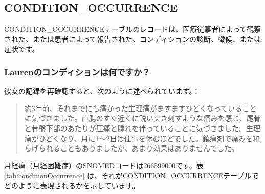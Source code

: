 \documentclass[
  11pt]{book}
\theoremstyle{definition}
\theoremstyle{definition}
\theoremstyle{definition}
\theoremstyle{definition}
\theoremstyle{remark}
\begin{document}
\subsection{CONDITION\_OCCURRENCE}\label{conditionOccurrence}

CONDITION\_OCCURRENCEテーブルのレコードは、医療従事者によって観察された、または患者によって報告された、コンディションの診断、徴候、または症状です。

\subsubsection*{Laurenのコンディションは何ですか？}\label{laurenux306eux30b3ux30f3ux30c7ux30a3ux30b7ux30e7ux30f3ux306fux4f55ux3067ux3059ux304b}

彼女の記録を再確認すると、次のように述べられています。：

\begin{quote}
約3年前、それまでにも痛かった生理痛がますますひどくなっていることに気づきました。直腸のすぐ近くに鋭い突き刺すような痛みを感じ、尾骨と骨盤下部のあたりが圧痛と腫れを伴っていることに気づきました。生理痛がひどくなり、月に1～2日は仕事を休むほどでした。鎮痛剤で痛みを和らげられることもありましたが、あまり効果はありませんでした。
\end{quote}

月経痛（月経困難症）のSNOMEDコードは266599000です。表 \ref{tab:conditionOccurrence} は、それがCONDITION\_OCCURRENCEテーブルでどのように表現されるかを示しています。
\end{document}
